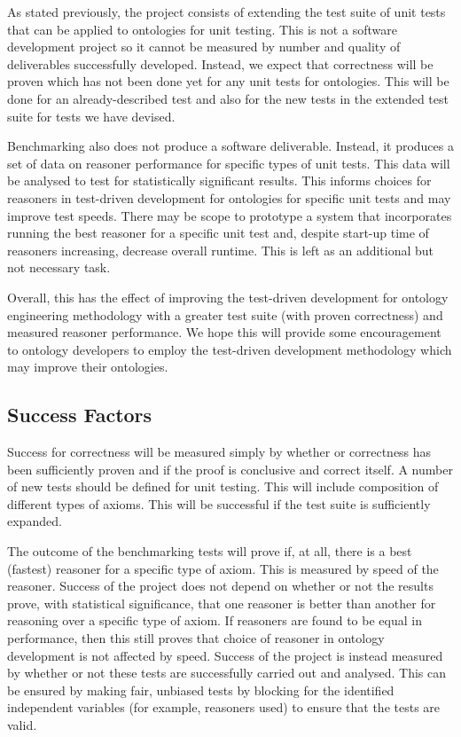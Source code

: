 \documentclass[draft]{sig-alternate}
\begin{document}
As stated previously, the project consists of extending the test suite of unit tests that can be applied to ontologies for unit testing. This is not a software development project so it cannot be measured by number and quality of deliverables successfully developed. Instead, we expect that correctness will be proven which has not been done yet for any unit tests for ontologies. This will be done for an already-described test and also for the new tests in the extended test suite for tests we have devised.

Benchmarking also does not produce a software deliverable. Instead, it produces a set of data on reasoner performance for specific types of unit tests. This data will be analysed to test for statistically significant results. This informs choices for reasoners in test-driven development for ontologies for specific unit tests and may improve test speeds. There may be scope to prototype a system that incorporates running the best reasoner for a specific unit test and, despite start-up time of reasoners increasing, decrease overall runtime. This is left as an additional but not necessary task.

Overall, this has the effect of improving the test-driven development for ontology engineering methodology with a greater test suite (with proven correctness) and measured reasoner performance. We hope this will provide some encouragement to ontology developers to employ the test-driven development methodology which may improve their ontologies.

\subsection{Success Factors}

Success for correctness will be measured simply by whether or correctness has been sufficiently proven and if the proof is conclusive and correct itself. A number of new tests should be defined for unit testing. This will include composition of different types of axioms. This will be successful if the test suite is sufficiently expanded.

The outcome of the benchmarking tests will prove if, at all, there is a best (fastest) reasoner for a specific type of axiom. This is measured by speed of the reasoner. Success of the project does not depend on whether or not the results prove, with statistical significance, that one reasoner is better than another for reasoning over a specific type of axiom. If reasoners are found to be equal in performance, then this still proves that choice of reasoner in ontology development is not affected by speed. Success of the project is instead measured by whether or not these tests are successfully carried out and analysed. This can be ensured by making fair, unbiased tests by blocking for the identified independent variables (for example, reasoners used) to ensure that the tests are valid.
\end{document}
